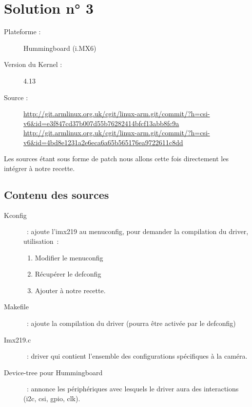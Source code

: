 
\chapter{Solution n° 3} %

\label{Chapter4} %

\begin{description}
  \item[Plateforme :] Hummingboard (i.MX6)
  \item[Version du Kernel :] 4.13
  \item[Source :] \href{http://git.armlinux.org.uk/cgit/linux-arm.git/commit/?h=csi-v6&id=e3f847cd37b007d55b76282414bfcf13abb8fc9a}
  {http://git.armlinux.org.uk/cgit/linux-arm.git/commit/?h=csi-v6\&id=e3f847cd37b007d55b76282414bfcf13abb8fc9a}
  \href{http://git.armlinux.org.uk/cgit/linux-arm.git/commit/?h=csi-v6&id=4bd8e1231a2e6eca6a65b565176ea9722611c8dd}
  {http://git.armlinux.org.uk/cgit/linux-arm.git/commit/?h=csi-v6\&id=4bd8e1231a2e6eca6a65b565176ea9722611c8dd}
\end{description}

Les sources étant sous forme de patch nous allons cette fois directement les intégrer à notre recette.

\section{Contenu des sources}
\begin{description}
\item[Kconfig] : ajoute l’imx219 au menuconfig, pour demander la compilation du driver, utilisation :
\begin{enumerate}
  \item Modifier le menuconfig
  \item Récupérer le defconfig
  \item Ajouter à notre recette.
\end{enumerate}
\item[Makefile] : ajoute la compilation du driver (pourra être activée par le defconfig)
\item[Imx219.c] : driver qui contient l’ensemble des configurations spécifiques à la caméra.
\item[Device-tree pour Hummingboard] : annonce les périphériques avec lesquels le driver aura des interactions (i2c, csi, gpio, clk).
\end{description}

